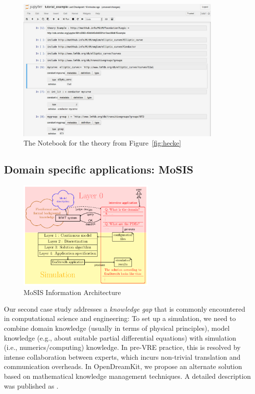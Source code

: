 \begin{figure}[ht]\centering
  \includegraphics[width=0.9\textwidth]{lmfdb_example}
  \caption{The Notebook for the theory from Figure~\ref{fig:hecke}}\label{fig:lmfdbexample}
\end{figure}


\subsection{Domain specific applications: MoSIS}

\begin{figure}[ht]\centering
  \includegraphics[width=0.6\textwidth]{proto}
  \caption{MoSIS Information Architecture}\label{fig:prototype}
\end{figure}

Our second case study addresses a \emph{knowledge gap} that is commonly encountered in computational science and engineering:
To set up a simulation, we need to combine domain knowledge (usually in terms of physical principles), model knowledge (e.g., about suitable partial differential equations) with simulation (i.e., numerics/computing) knowledge.
In pre-VRE practice, this is resolved by intense collaboration between experts, which incurs non-trivial translation and communication overheads.
In OpenDreamKit, we propose an alternate solution based on mathematical knowledge management techniques.
A detailed description was published as \cite{PolKohKoe:kacse18}.

